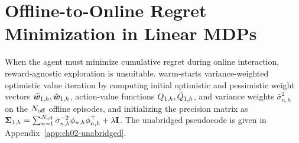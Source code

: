 \section{Offline-to-Online Regret Minimization in Linear MDPs}
\label{sec:ch02-lin-regret}

When the agent must minimize cumulative regret during online interaction, reward-agnostic exploration is unsuitable.  warm-starts variance-weighted optimistic value iteration \citep{he2023nearly} by computing initial optimistic and pessimistic weight vectors $\widehat{\vw}_{1,h}, \widecheck{\vw}_{1,h}$, action-value functions $Q_{1,h}, \widecheck{Q}_{1,h}$, and variance weights $\bar{\sigma}_{n,h}^2$ on the $N_{\off}$ offline episodes, and initializing the precision matrix as $\mSigma_{1,h} = \sum_{n=1}^{N_{\off}} \bar{\sigma}_{n,h}^{-2}\phi_{n,h}\phi_{n,h}^\top + \lambda \mathbf{I}$. The unabridged pseudocode is given in Appendix~\ref{app:ch02-unabridged}.


